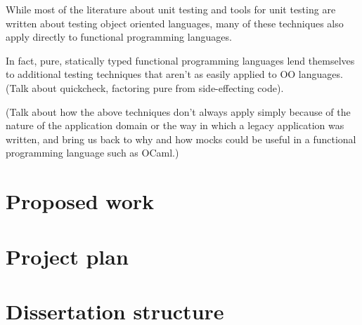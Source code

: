 \documentclass[proposal]{softeng}
\begin{document}

While most of the literature about unit testing and tools for unit
testing are written about testing object oriented languages, many of
these techniques also apply directly to functional programming
languages.

In fact, pure, statically typed functional programming languages lend
themselves to additional testing techniques that aren't as easily
applied to OO languages. (Talk about quickcheck, factoring pure from
side-effecting code).

(Talk about how the above techniques don't always apply simply because
of the nature of the application domain or the way in which a legacy
application was written, and bring us back to why and how mocks could
be useful in a functional programming language such as OCaml.)

\section{Proposed work}


\section{Project plan}


\section{Dissertation structure}


\nocite{*}


\end{document}
